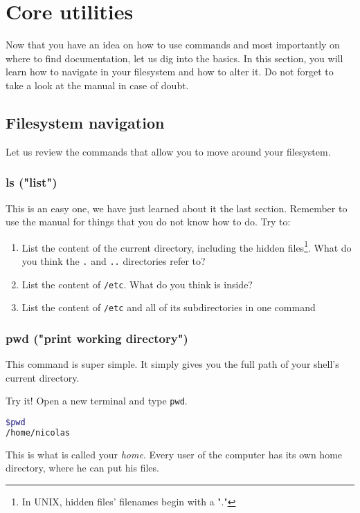 \documentclass[12pt]{article}
\begin{document}
\section{Core utilities}

Now that you have an idea on how to use commands and most importantly on where to find documentation, let us dig into the basics.
In this section, you will learn how to navigate in your filesystem and how to alter it.
Do not forget to take a look at the manual in case of doubt.

\subsection{Filesystem navigation}

Let us review the commands that allow you to move around your filesystem.

\subsubsection{ls ("list")}

This is an easy one, we have just learned about it the last section. Remember to use the manual for things that you do not know how to do.
Try to:
\begin{enumerate}
\item List the content of the current directory, including the hidden files\footnote{In UNIX, hidden files' filenames begin with a "."}. What do you think the \texttt{.} and \texttt{..} directories refer to?
\item List the content of \texttt{/etc}. What do you think is inside?
\item List the content of \texttt{/etc} and all of its subdirectories in one command
\end{enumerate}

\subsubsection{pwd ("print working directory")}

This command is super simple. It simply gives you the full path of your shell's current directory.

Try it! Open a new terminal and type \texttt{pwd}.
\begin{lstlisting}[language=bash]
$pwd
/home/nicolas
\end{lstlisting}
This is what is called your \textit{home}. Every user of the computer has its own home directory, where he can put his files.
\end{document}
